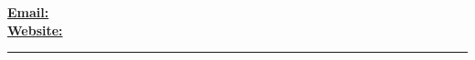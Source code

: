 \begin{center}
	\begin{minipage}[b]{.3\textwidth}
	\raggedright
	{\large \phone} \\ %
	{\city} %
	
	\end{minipage}%
	\begin{minipage}[b]{.4\textwidth}
	\makeatletter
	\centering {\HUGE \@author} \\
	\makeatother
    \vspace{.5em}
    {\color{highlight} \Large{\role}}
	\end{minipage}%
	\begin{minipage}[b]{.3\textwidth}
	\raggedleft 
	\href{mailto:\email}{\textbf{Email:} \email}\\ 
	\href{https://hadi2525.github.io/\Web}{\textbf{Website:} \Web}
%	
	\end{minipage}

{\color{highlight} \hrule}
\end{center}